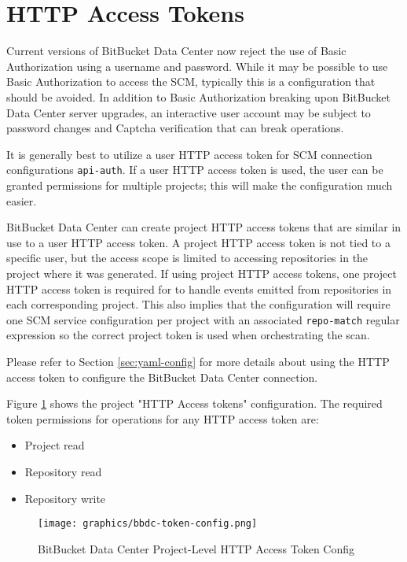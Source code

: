 \section{\cxoneflowtext\space HTTP Access Tokens}

Current versions of BitBucket Data Center now reject the use of Basic Authorization using
a username and password. While it may be possible to use Basic Authorization to access the SCM, typically
this is a configuration that should be avoided.  In addition to Basic Authorization breaking upon BitBucket Data Center
server upgrades, an interactive user account may be subject to password changes and Captcha verification that
can break \cxoneflow operations.  

It is generally best to utilize a user HTTP access token for SCM connection
configurations \texttt{api-auth}.  If a user HTTP access token is used, the user can be granted
permissions for multiple projects; this will make the \cxoneflow configuration much easier. 

BitBucket Data Center can create project HTTP access tokens that are similar in use to
a user HTTP access token.  A project HTTP access token is not tied to a specific user, but the
access scope is limited to accessing repositories in the project where it was generated.
If using project HTTP access tokens, one project HTTP access token is required for \cxoneflow
to handle events emitted from repositories in each corresponding project. This also implies that
the \cxoneflow configuration will require one SCM service configuration per project with an
associated \texttt{repo-match} regular expression so the correct project token is used when
orchestrating the scan.

Please refer to Section \ref{sec:yaml-config} for more details about using the HTTP access token
to configure the BitBucket Data Center connection.

Figure \ref{fig:bbdc-token-config} shows the project "HTTP Access tokens" configuration.  The required
token permissions for \cxoneflow operations for any HTTP access token are:

\begin{itemize}
    \item Project read
    \item Repository read
    \item Repository write
\end{itemize}


\begin{figure}[ht]
    \texttt{[image: graphics/bbdc-token-config.png]}
    \caption{BitBucket Data Center Project-Level HTTP Access Token Config}
    \label{fig:bbdc-token-config}
\end{figure}


